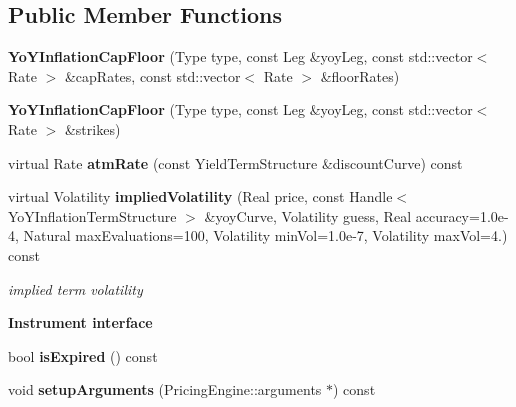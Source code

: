 \subsection*{Public Member Functions}
\begin{DoxyCompactItemize}
\item 
{\bfseries Yo\+Y\+Inflation\+Cap\+Floor} (Type type, const Leg \&yoy\+Leg, const std\+::vector$<$ Rate $>$ \&cap\+Rates, const std\+::vector$<$ Rate $>$ \&floor\+Rates)\label{class_quant_lib_1_1_yo_y_inflation_cap_floor_a65a89f1b5e721d5e9566ff506cc2be58}

\item 
{\bfseries Yo\+Y\+Inflation\+Cap\+Floor} (Type type, const Leg \&yoy\+Leg, const std\+::vector$<$ Rate $>$ \&strikes)\label{class_quant_lib_1_1_yo_y_inflation_cap_floor_a0ef2fabc52a2a45e181a86779d9a23fb}

\item 
virtual Rate {\bfseries atm\+Rate} (const Yield\+Term\+Structure \&discount\+Curve) const \label{class_quant_lib_1_1_yo_y_inflation_cap_floor_aed2713c60b490127ec6801dbeb0a2a78}

\item 
virtual Volatility {\bf implied\+Volatility} (Real price, const Handle$<$ Yo\+Y\+Inflation\+Term\+Structure $>$ \&yoy\+Curve, Volatility guess, Real accuracy=1.\+0e-\/4, Natural max\+Evaluations=100, Volatility min\+Vol=1.\+0e-\/7, Volatility max\+Vol=4.) const \label{class_quant_lib_1_1_yo_y_inflation_cap_floor_abd869004a9b8fd2af58873552261aec3}

\begin{DoxyCompactList}\small\item\em implied term volatility \end{DoxyCompactList}\end{DoxyCompactItemize}
\begin{Indent}{\bf Instrument interface}\par
\begin{DoxyCompactItemize}
\item 
bool {\bfseries is\+Expired} () const \label{class_quant_lib_1_1_yo_y_inflation_cap_floor_ad58ce3eafc0d1218a340ecef8d961834}

\item 
void {\bfseries setup\+Arguments} (Pricing\+Engine\+::arguments $\ast$) const \label{class_quant_lib_1_1_yo_y_inflation_cap_floor_a1a8bcb2872ab9d81a40131f677d1e596}

\end{DoxyCompactItemize}
\end{Indent}
